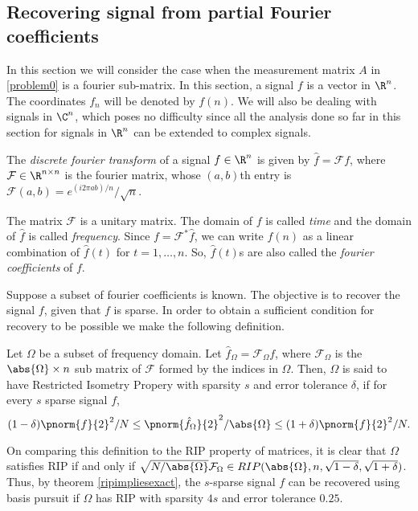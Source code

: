 \subsection{Recovering signal from partial Fourier coefficients}
	In this section we will consider the case when the
	measurement matrix $A$ in \eqref{problem0} is
	a fourier sub-matrix. In this section,
	a signal $f$ is a vector in $\R^n$. The coordinates $f_n$
	will be denoted by $f(n)$. We will also be dealing with
	signals in $\C^n$, which poses no difficulty since all
	the analysis
	done so far in this section for signals in $\R^n$ can be
	extended to complex signals.
	\begin{definition}
		The \emph{discrete fourier transform} of a signal $f\in \R^n$
		is given by $\hat{f} = \mathcal{F}f$,
		where $\mathcal{F}\in \R^{n\times n}$ is the fourier matrix,
		whose $(a, b)$th entry is $\mathcal{F}(a,b) =
		e^{(i2\pi ab)/n}/\sqrt{n}$.
	\end{definition}
	The	matrix $\mathcal{F}$ is a unitary matrix.
	The domain of $f$ is called \emph{time} and the
	domain of $\hat{f}$ is
	called \emph{frequency}.
	Since
	$f = \mathcal{F}^* \hat{f}$, we can write $f(n)$ as
	a linear combination of $\hat{f}(t)$ for $t = 1,\ldots, n$.
	So, $\hat{f}(t)$s are also called the \emph{fourier coefficients}
	of $f$.

	Suppose a subset of fourier coefficients is known.
	The objective is to recover the signal $f$, given that
	$f$ is sparse. In order to obtain a sufficient
	condition for recovery to be possible we make the
	following definition.

	\begin{definition}
		Let $\Omega$ be a subset of frequency domain.
		Let $\hat{f}_{\Omega} = \mathcal{F}_\Omega f$, where
		$\mathcal{F}_\Omega$ is the $\abs{\Omega}\times n$
		sub matrix of $\mathcal{F}$ formed by the indices in
		$\Omega$. Then, $\Omega$ is said to have
		Restricted Isometry Propery with sparsity $s$ and
		error tolerance $\delta$, if for every $s$ sparse signal $f$,
		\[
			(1-\delta){\pnorm{f}{2}^2}/{N}\leq
			{\pnorm{\hat{f}_{\Omega}}{2}^2}/{\abs{\Omega}}\leq
			(1+\delta) {\pnorm{f}{2}^2}/{N}.
		\]
	\end{definition}
	On comparing this definition to the RIP
	property of matrices, it is clear that $\Omega$ satisfies
	RIP if and only if $\sqrt{N/\abs{\Omega}}\mathcal{F}_\Omega
	\in RIP(\abs{\Omega}, n,
	\sqrt{1-\delta}, \sqrt{1+\delta})$.
	Thus, by theorem \ref{ripimpliesexact}, the $s$-sparse
	signal $f$ can be recovered using basis pursuit
	if $\Omega$ has RIP with sparsity $4s$ and error tolerance
	$0.25$.


